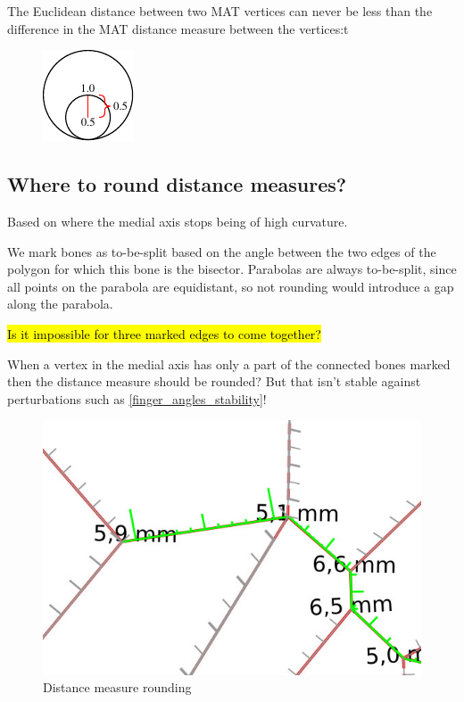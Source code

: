 The Euclidean distance between two MAT vertices can never be less than the difference in the MAT distance measure between the vertices:t
\begin{figure}[H]
\centering
\includegraphics[width=.3\columnwidth]{sources/method/distance_ratio_limit.pdf}
\end{figure}




\subsection{Where to round distance measures?}
Based on where the medial axis stops being of high curvature.

We mark bones as to-be-split based on the angle between the two edges of the polygon for which this bone is the bisector.
Parabolas are always to-be-split, since all points on the parabola are equidistant, so not rounding would introduce a gap along the parabola.

\hl{Is it impossible for three marked edges to come together?}

When a vertex in the medial axis has only a part of the connected bones marked then the distance measure should be rounded?
But that isn't stable against perturbations such as \cref{finger_angles_stability}!


\begin{figure}[H]
\centering
\includegraphics[width=.6\columnwidth]{sources/method/rounded_dist_measures.jpg}
\caption{Distance measure rounding}
\label{rounded_dist_measures}
\end{figure}

